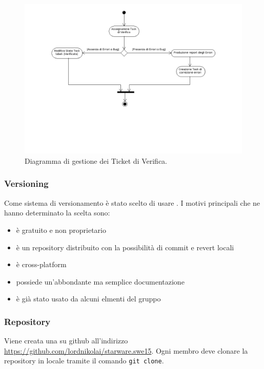 \documentclass[12pt,a4paper]{article}
\begin{document}
\begin{center}
\begin{figure}[h]
\centering
\label{f2-Ticket Verifica}
\includegraphics[scale=0.5]{ticketVerifica.png}
\caption{Diagramma di gestione dei Ticket di Verifica.}
\end{figure}
\end{center}

\newpage
\subsubsection{Versioning} %
Come sistema di versionamento è stato scelto di usare . I motivi principali che ne hanno determinato la scelta sono:
\begin{itemize}
\item è gratuito e non proprietario
\item è un repository distribuito con la possibilità di commit e revert locali
\item è cross-platform
\item possiede un'abbondante ma semplice documentazione
\item è già stato usato da alcuni elmenti del gruppo
\end{itemize}

\subsubsection{Repository} %
Viene creata una  su github all'indirizzo \url{https://github.com/lordnikolai/starware.swe15}. Ogni membro deve clonare la repository in locale tramite il comando \texttt{git clone}.
\end{document}
